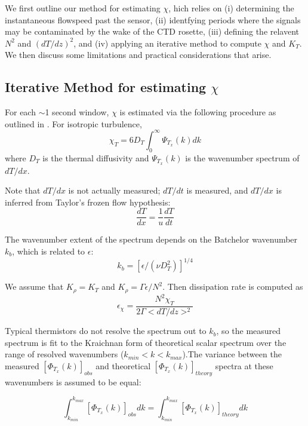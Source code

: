 \documentclass{ametsoc}
\begin{document}
We first outline our method for estimating $\chi$, hich relies on (i) determining the instantaneous flowspeed past the sensor, (ii) identfying periods where the signals may be contaminated by the wake of the CTD rosette, (iii) defining the relavent $N^2$ and $(dT/dz)^2$, and (iv) applying an iterative method to compute $\chi$ and $K_T$. We then discuss some limitations and practical considerations that arise.

\subsection{Iterative Method for estimating $\chi$}

For each $\sim$1 second window, $\chi$ is estimated via the following procedure as outlined in \cite{moumnash09}. For isotropic turbulence,
\begin{equation}
\chi_T=6D_T \int_{0}^{\infty}\Psi_{T_x} (k) dk
\label{eq:chiint}
\end{equation}
where $D_T$ is the thermal diffusivity and $\Psi_{T_x} (k)$ is the wavenumber spectrum of $dT/dx$.

Note that $dT/dx$ is not actually measured; $dT/dt$ is measured, and $dT/dx$ is inferred from Taylor's frozen flow hypothesis:
 \begin{equation}
\frac{dT}{dx}=\frac{1}{u}\frac{dT}{dt}
\label{eq:2}
\end{equation}

The wavenumber extent of the spectrum depends on the Batchelor wavenumber $k_b$, which is related to $\epsilon$:
\begin{equation}
k_b=[\epsilon/(\nu D_{T}^{2})]^{1/4}
\label{eq:3}
\end{equation}

We assume that $K_{\rho}=K_T$ and $K_{\rho}=\Gamma \epsilon /N^2$. Then dissipation rate is computed as
\begin{equation}
\label{eq:eps}
\epsilon_{\chi}=\frac{N^2\chi_T}{2\Gamma <dT/dz>^2}
\end{equation}

Typical thermistors do not resolve the spectrum out to $k_b$, so the measured spectrum is fit to the Kraichnan form of theoretical scalar spectrum over the range of resolved wavenumbers ($k_{min}<k<k_{max}$).The variance between the measured $[\Phi_{T_x}(k)]_{obs}$ and theoretical $[\Phi_{T_x}(k)]_{theory}$ spectra at these wavenumbers is assumed to be equal:

\begin{equation}
\int^{k_{max}}_{k_{min}}[\Phi_{T_x}(k)]_{obs}dk=\int^{k_{max}}_{k_{min}}[\Phi_{T_x}(k)]_{theory}dk
\label{eq:speceq}
\end{equation}
\end{document}
